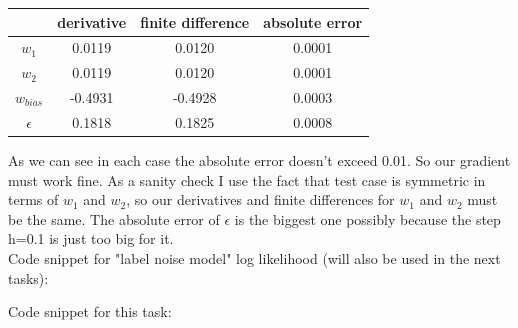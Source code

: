 \documentclass{article}
\begin{document}
\begin{enumerate}[label=(\alph*)]
\begin{center}
							\begin{tabular}{| c | c | c | c |}
								\hline
								\, & derivative & finite difference & absolute error \\
								\hline
								$w_{1}$ 	& 0.0119 & 0.0120 & 0.0001 \\
								\hline
								$w_{2}$     & 0.0119 & 0.0120 & 0.0001 \\
								\hline
							    $w_{bias}$ &-0.4931 &-0.4928& 0.0003 \\
							    \hline
							    $\epsilon$ & 0.1818 & 0.1825 & 0.0008 \\
							    \hline
							\end{tabular}
						\end{center}
						As we can see in each case the absolute error doesn't exceed 0.01. So our gradient must work fine. As a sanity check I use the fact that test case is symmetric in terms of $w_{1}$ and $w_{2}$, so our derivatives and finite differences for $w_{1}$ and $w_{2}$ must be the same. The absolute error of $\epsilon$ is the biggest one possibly because the step h=0.1 is just too big for it. \\
						Code snippet for "label noise model" log likelihood (will also be used in the next tasks):
						
						Code snippet for this task:
						
						

\end{enumerate}
\end{document}
